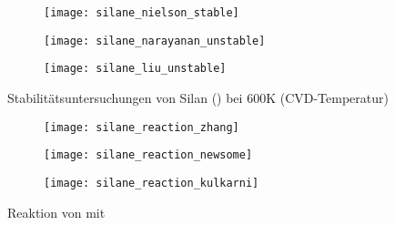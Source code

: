 \begin{figure}[!ht]

  \captionsetup[subfigure]{singlelinecheck=false}
  \def\subfigwidth{0.32\textwidth}
  \begin{subfigure}[t]{3.5cm}
    \texttt{[image: silane\_nielson\_stable]}
  \end{subfigure}
  \hfill
  \begin{subfigure}[t]{4.5cm}
    \texttt{[image: silane\_narayanan\_unstable]}
  \end{subfigure}
  \hfill
  \begin{subfigure}[t]{5cm}
    \texttt{[image: silane\_liu\_unstable]}
  \end{subfigure}

  \caption[Stabilitätsuntersuchungen von Silan]{
    Stabilitätsuntersuchungen von Silan () bei 600K (CVD-Temperatur)
  }
  \label{fig:silanestability}

\end{figure}

\begin{figure}[!ht]

  \captionsetup[subfigure]{singlelinecheck=false}
  \def\subfigwidth{0.32\textwidth}
  \begin{subfigure}[t]{3cm}
    \texttt{[image: silane\_reaction\_zhang]}
  \end{subfigure}
  \hfill
  \begin{subfigure}[t]{5cm}
    \texttt{[image: silane\_reaction\_newsome]}
  \end{subfigure}
  \hfill
  \begin{subfigure}[t]{4.5cm}
    \texttt{[image: silane\_reaction\_kulkarni]}
  \end{subfigure}

  \caption[Reaktionen von  mit ]{
    Reaktion von  mit 
  }
  \label{fig:precursorreactions}

\end{figure}

